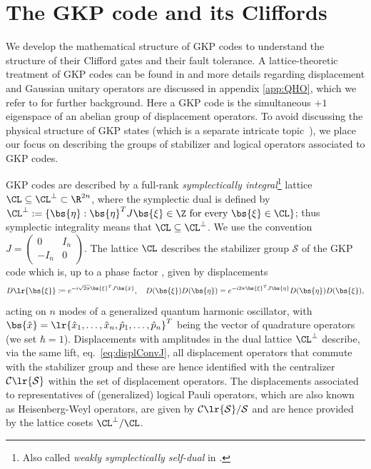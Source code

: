 \documentclass[a4paper, aps, pra, 11pt, onecolumn, tightenlines, superscriptaddress]{revtex4-2}
\begin{document}
\section{The GKP code and its Cliffords}\label{sec:Cliffords}


We develop the mathematical structure of GKP codes to understand the structure of their Clifford gates and their fault tolerance. 
A lattice-theoretic treatment of GKP codes can be found in \cite{Conrad_2022, Royer_2022, Schmidt_2022, HarringtonPreskill, Harrington_Thesis, GKP} and more details regarding displacement and Gaussian unitary operators are discussed in appendix \ref{app:QHO}, which we refer to for further background.
Here a GKP code is the simultaneous $+1$ eigenspace of an abelian group of displacement operators. To avoid discussing the physical structure of GKP states (which is a separate intricate topic~\cite{GKP}), we place our focus on describing the groups of stabilizer and logical operators associated to GKP codes.

GKP codes are described by a full-rank \textit{symplectically integral}\footnote{Also called \textit{weakly symplectically self-dual} in \cite{conrad2023good}.} lattice $\CL\subseteq\CL^{\perp}\subset \R^{2n}$, where the symplectic dual is defined by $\CL^{\perp}:=\{\bs{\eta}:\bs{\eta}^{T}J\bs{\xi}\in\Z\text{ for every }\bs{\xi}\in\CL\}$; thus symplectic integrality means that $\CL\subseteq\CL^{\perp}$. We use the convention $J=\begin{pmatrix}
0 & I_n \\ -I_n & 0
\end{pmatrix}$. 
The lattice $\CL$ describes the stabilizer group $\mathcal{S}$ of the GKP code which is, up to a phase factor \cite{Conrad_2022}, given by displacements 
\begin{equation}
    D\lr{\bs{\xi}} \coloneqq e^{-i \sqrt{2\pi} \bs{\xi}^T J \bs{\hat{x}}},\quad D(\bs{\xi})D(\bs{\eta})=e^{-i2\pi\bs{\xi}^{T}J\bs{\eta}}D(\bs{\eta})D(\bs{\xi}), \label{eq:displConvJ}
\end{equation} 
acting on $n$ modes of a generalized quantum harmonic oscillator, with $\bs{\hat{x}}=\lr{\hat{x}_1,\hdots, \hat{x}_n,\hat{p}_1,\hdots, \hat{p}_n}^T$ being the vector of quadrature operators (we set $\hbar=1$). 
Displacements with amplitudes in the dual lattice $\CL^{\perp}$ describe, via the same lift, eq.~\eqref{eq:displConvJ}, all displacement operators that commute with the stabilizer group and these are hence identified with the centralizer $\mathcal{C}\lr{\mathcal{S}}$ within the set of displacement operators. 
The displacements associated to representatives of (generalized) logical Pauli operators, which are also known as Heisenberg-Weyl operators, are given by $\mathcal{C}\lr{\mathcal{S}} / \mathcal{S}$ and are hence provided by the lattice cosets $\CL^{\perp}/\CL$. 
\end{document}
